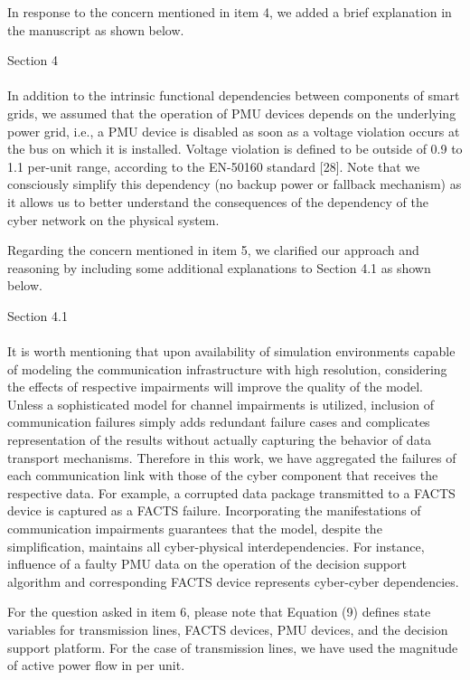\documentclass{article}
\newenvironment{response}{
  \doublespacing
  \setlength\parindent{0.05\linewidth}
  \ttfamily
}{}
\newenvironment{textblock}[1]
{\begin{tcolorbox}[breakable,enhanced]{#1 \\ \\}}
{\end{tcolorbox}}
\begin{document}
\begin{response}
In response to the concern mentioned in item 4, we added a brief explanation in the manuscript as shown below.

\begin{textblock}{Section 4}
In addition to the intrinsic functional dependencies between components of smart grids, we assumed that the operation of PMU devices depends on the underlying power grid, i.e., a PMU device is disabled as soon as a voltage violation occurs at the bus on which it is installed. Voltage violation is defined to be outside of 0.9 to 1.1 per-unit range, according to the EN-50160 standard [28]. Note that we consciously simplify this dependency (no backup power or fallback mechanism) as it allows us to better understand the consequences of the dependency of the cyber network on the physical system.
\end{textblock}

Regarding the concern mentioned in item 5, we clarified our approach and reasoning by including some additional explanations to Section 4.1 as shown below.

\begin{textblock}{Section 4.1}
It is worth mentioning that upon availability of simulation environments capable of modeling the communication infrastructure with high resolution, considering the effects of respective impairments will improve the quality of the model. Unless a sophisticated model for channel impairments is utilized, inclusion of communication failures simply adds redundant failure cases and complicates representation of the results without actually capturing the behavior of data transport mechanisms. Therefore in this work, we have aggregated the failures of each communication link with those of the cyber component that receives the respective data. For example, a corrupted data package transmitted to a FACTS device is captured as a FACTS failure. Incorporating the manifestations of communication impairments guarantees that the model, despite the simplification, maintains all cyber-physical interdependencies. For instance, influence of a faulty PMU data on the operation of the decision support algorithm and corresponding FACTS device represents cyber-cyber dependencies.
\end{textblock}

For the question asked in item 6, please note that Equation (9) defines state variables for transmission lines, FACTS devices, PMU devices, and the decision support platform. For the case of transmission lines, we have used the magnitude of active power flow in per unit.


\end{response}
\end{document}
